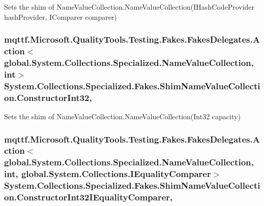 Sets the shim of Name\-Value\-Collection.\-Name\-Value\-Collection(\-I\-Hash\-Code\-Provider hash\-Provider, I\-Comparer comparer)

\hypertarget{class_system_1_1_collections_1_1_specialized_1_1_fakes_1_1_shim_name_value_collection_aa0040bab7a1f2bf97a09a357029fe196}{
\subsubsection[{Constructor\-Int32}]{\setlength{\rightskip}{0pt plus 5cm}mqttf.\-Microsoft.\-Quality\-Tools.\-Testing.\-Fakes.\-Fakes\-Delegates.\-Action$<$global.\-System.\-Collections.\-Specialized.\-Name\-Value\-Collection, int$>$ System.\-Collections.\-Specialized.\-Fakes.\-Shim\-Name\-Value\-Collection.\-Constructor\-Int32\hspace{0.3cm}{\ttfamily [static]}, {\ttfamily [set]}}}\label{class_system_1_1_collections_1_1_specialized_1_1_fakes_1_1_shim_name_value_collection_aa0040bab7a1f2bf97a09a357029fe196}


Sets the shim of Name\-Value\-Collection.\-Name\-Value\-Collection(\-Int32 capacity)

\hypertarget{class_system_1_1_collections_1_1_specialized_1_1_fakes_1_1_shim_name_value_collection_a9e52dbcfd58ea5f3cd9ae4da7f689c9a}{
\subsubsection[{Constructor\-Int32\-I\-Equality\-Comparer}]{\setlength{\rightskip}{0pt plus 5cm}mqttf.\-Microsoft.\-Quality\-Tools.\-Testing.\-Fakes.\-Fakes\-Delegates.\-Action$<$global.\-System.\-Collections.\-Specialized.\-Name\-Value\-Collection, int, global.\-System.\-Collections.\-I\-Equality\-Comparer$>$ System.\-Collections.\-Specialized.\-Fakes.\-Shim\-Name\-Value\-Collection.\-Constructor\-Int32\-I\-Equality\-Comparer\hspace{0.3cm}{\ttfamily [static]}, {\ttfamily [set]}}}\label{class_system_1_1_collections_1_1_specialized_1_1_fakes_1_1_shim_name_value_collection_a9e52dbcfd58ea5f3cd9ae4da7f689c9a}


